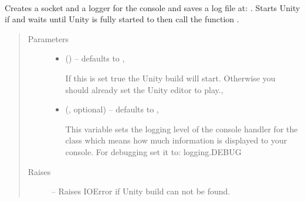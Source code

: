 \documentclass[letterpaper,10pt,english]{sphinxmanual}
\begin{document}
\begin{fulllineitems}
\label{\detokenize{index:client.client_communicator_to_unity}}~

\begin{fulllineitems}
\label{\detokenize{index:client.client_communicator_to_unity.__init__}}
Creates a socket and a logger for the console and saves a log file at: .
Starts Unity if  and waits until Unity is fully started to then call the function .
\begin{quote}\begin{description}
\item[{Parameters}] \leavevmode\begin{itemize}
\item {} 
 (\sphinxstyleliteralemphasis{\sphinxupquote{, }}) -- 
defaults to ,

If this is set true the Unity build will start. Otherwise you should already set the Unity editor to play.,


\item {} 
 (, optional) -- 
defaults to ,

This variable sets the logging level of the console handler for the class which means how much information is displayed to your console.
For debugging set it to: logging.DEBUG


\end{itemize}

\item[{Raises}] \leavevmode
{} -- Raises IOError if Unity build can not be found.


\end{description}
\end{quote}
\end{fulllineitems}
\end{fulllineitems}
\end{document}
